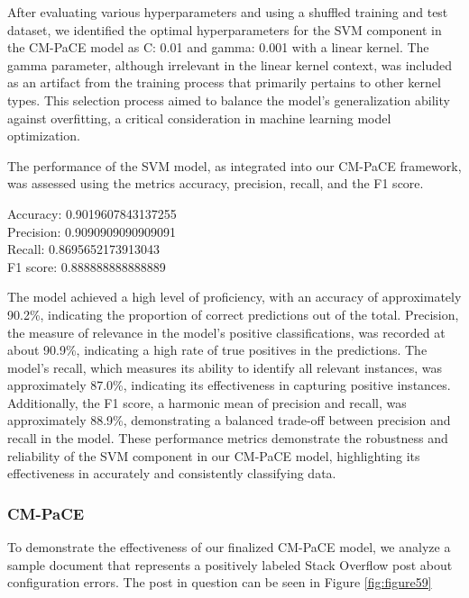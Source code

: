 \documentclass[english,bachelor]{swsLeipzig}
\begin{document}
After evaluating various hyperparameters and using a shuffled training and test dataset, we identified 
the optimal hyperparameters for the SVM component in the CM-PaCE model as C: 0.01 and gamma: 0.001 with a linear kernel. The gamma parameter, although irrelevant in the linear kernel context, was included as an artifact from the training process that primarily pertains to other kernel types. This selection process aimed to balance the model's generalization ability against overfitting, a critical consideration in machine learning model optimization.

The performance of the SVM model, as integrated into our CM-PaCE framework, was assessed using the  metrics accuracy, precision, recall, and the F1 score.\\

\begin{adjustwidth}{1cm}{0cm}
  Accuracy: 0.9019607843137255\\
  Precision: 0.9090909090909091\\
  Recall: 0.8695652173913043\\
  F1 score: 0.888888888888889\\
\end{adjustwidth}

The model achieved a high level of proficiency, with an accuracy of approximately 90.2\%, indicating the 
proportion of correct predictions out of the total. Precision, the measure of relevance in the model's positive classifications, was recorded at about 90.9\%, indicating a high rate of true positives in the predictions. The model's recall, which measures its ability to identify all relevant instances, was approximately 87.0\%, indicating its effectiveness in capturing positive instances. Additionally, the F1 score, a harmonic mean of precision and recall, was approximately 88.9\%, demonstrating a balanced trade-off between precision and recall in the model. These performance metrics demonstrate the robustness and reliability of the SVM component in our CM-PaCE model, highlighting its effectiveness in accurately and consistently classifying data.

\subsubsection{CM-PaCE}

To demonstrate the effectiveness of our finalized CM-PaCE model, we analyze a sample document that represents a positively labeled Stack Overflow post about configuration errors. The post in question can be seen in Figure \ref{fig:figure59}
\end{document}
